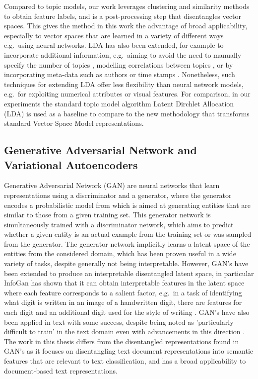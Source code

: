 Compared to topic models, our work leverages clustering and similarity methods to obtain  feature labels, and is a post-processing step that disentangles vector spaces. This gives the method in this work the advantage of broad applicability, especially to vector spaces that are learned in a variety of different ways e.g.\ using neural networks. LDA has also been extended, for example to incorporate additional information, e.g.\ aiming to avoid the need to manually specify the number of topics \cite{teh2005sharing}, modelling correlations between topics \cite{Blei2006}, or by incorporating meta-data such as authors or time stamps \cite{rosen2004author,wang2006topics}. Nonetheless, such techniques for extending LDA offer less flexibility than neural network models, e.g.\ for exploiting numerical attributes or visual features. For comparison, in our experiments the standard topic model algorithm Latent Dirchlet Allocation (LDA) is used as a baseline to  compare to the new methodology that transforms standard Vector Space Model representations. 

\subsection{Generative Adversarial Network and Variational Autoencoders}

Generative Adversarial Network (GAN) \cite{Goodfellow2014} are neural networks that learn representations using a discriminator and a generator, where the generator encodes a probabilistic model from which is aimed at generating entities that are similar to those from a given training set. This generator network is simultaneously trained with a discriminator network, which aims to predict whether a given entity is an actual example from the training set or was sampled from the generator.  The generator network implicitly learns a latent space of the entities from the considered domain, which has been proven useful in a wide variety of tasks, despite generally not being interpretable. However, GAN's have been extended to produce an interpretable disentangled latent space, in particular  InfoGan has shown that it can obtain interpretable features in the latent space where each feature corresponds to a salient factor, e.g.\ in a task of identifying what digit is written in an image of a handwritten digit, there are features for each digit and an additional digit used for the style of writing \cite{Chen2016}. GAN's have  also been applied in text \cite{Bowman2015, Kim} with some success, despite being noted as 'particularly difficult to train' in the text domain \cite{Arjovsky2017} even with advancements in this direction \cite{Mescheder2018}. The work in this thesis differs from the disentangled representations found in GAN's as it focuses on disentangling text document representations into semantic features that are relevant to text classification, and has a broad applicability to document-based text representations.

